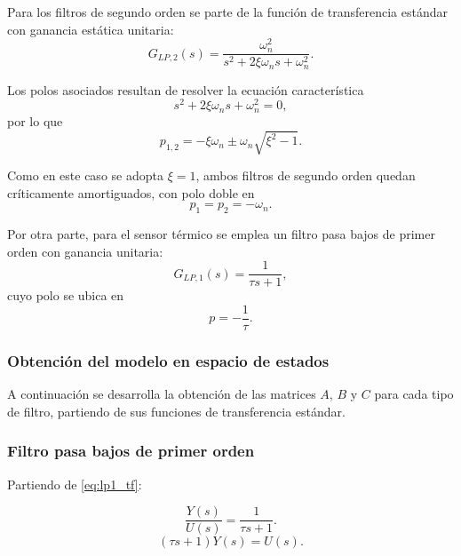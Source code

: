 \documentclass[12pt, a4paper,journal, onecolumn, compsoc]{IEEEtran}
\begin{document}
Para los filtros de segundo orden se parte de la función de transferencia estándar con ganancia estática unitaria:
\begin{equation}
    G_{LP,2}(s)=\frac{\omega_n^2}{s^2+2\xi\omega_n s+\omega_n^2}.
    \label{eq:lp2_tf}
\end{equation}

Los polos asociados resultan de resolver la ecuación característica
\begin{equation}
    s^2+2\xi\omega_n s+\omega_n^2=0,
\end{equation}
por lo que
\begin{equation}
    p_{1,2}=-\xi\omega_n\pm\omega_n\sqrt{\xi^2-1}.
\end{equation}

Como en este caso se adopta $\xi=1$, ambos filtros de segundo orden quedan críticamente amortiguados, con polo doble en
\begin{equation}
    p_1=p_2=-\omega_n.
\end{equation}

Por otra parte, para el sensor térmico se emplea un filtro pasa bajos de primer orden con ganancia unitaria:
\begin{equation}
    G_{LP,1}(s)=\frac{1}{\tau s+1},
    \label{eq:lp1_tf}
\end{equation}
cuyo polo se ubica en
\begin{equation}
    p=-\frac{1}{\tau}.
\end{equation}

\subsubsection*{Obtención del modelo en espacio de estados}

A continuación se desarrolla la obtención de las matrices $A$, $B$ y $C$ para cada tipo de filtro, partiendo de sus funciones de transferencia estándar.

\subsubsection*{Filtro pasa bajos de primer orden}

Partiendo de \eqref{eq:lp1_tf}:

\begin{equation}
    \frac{Y(s)}{U(s)}=\frac{1}{\tau s+1}.
\end{equation}
\begin{equation}
    (\tau s+1)Y(s)=U(s).
\end{equation}
\end{document}
